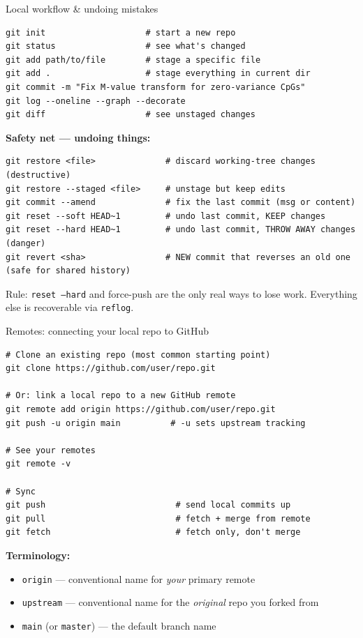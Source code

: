 \documentclass[10pt,aspectratio=169]{beamer}
\begin{document}
\begin{frame}[fragile]{Local workflow \& undoing mistakes}
\begin{lstlisting}
git init                    # start a new repo
git status                  # see what's changed
git add path/to/file        # stage a specific file
git add .                   # stage everything in current dir
git commit -m "Fix M-value transform for zero-variance CpGs"
git log --oneline --graph --decorate
git diff                    # see unstaged changes
\end{lstlisting}

  \textbf{Safety net --- undoing things:}
\begin{lstlisting}
git restore <file>              # discard working-tree changes (destructive)
git restore --staged <file>     # unstage but keep edits
git commit --amend              # fix the last commit (msg or content)
git reset --soft HEAD~1         # undo last commit, KEEP changes
git reset --hard HEAD~1         # undo last commit, THROW AWAY changes (danger)
git revert <sha>                # NEW commit that reverses an old one (safe for shared history)
\end{lstlisting}
  \alert{Rule:} \texttt{reset --hard} and force-push are the only real ways to lose work. Everything else is recoverable via \texttt{reflog}.
\end{frame}


\begin{frame}[fragile]{Remotes: connecting your local repo to GitHub}
\begin{lstlisting}
# Clone an existing repo (most common starting point)
git clone https://github.com/user/repo.git

# Or: link a local repo to a new GitHub remote
git remote add origin https://github.com/user/repo.git
git push -u origin main          # -u sets upstream tracking

# See your remotes
git remote -v

# Sync
git push                          # send local commits up
git pull                          # fetch + merge from remote
git fetch                         # fetch only, don't merge
\end{lstlisting}

  \textbf{Terminology:}
  \begin{itemize}
    \item \texttt{origin} --- conventional name for \emph{your} primary remote
    \item \texttt{upstream} --- conventional name for the \emph{original} repo you forked from
    \item \texttt{main} (or \texttt{master}) --- the default branch name
  \end{itemize}
\end{frame}
\end{document}
